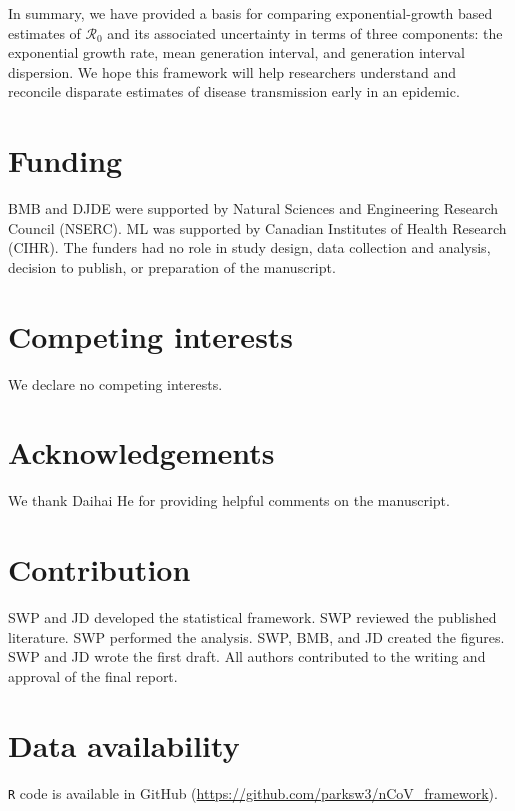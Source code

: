 \documentclass[12pt]{article}
\newcommand{\Ro}{\ensuremath{{\mathcal R}_{0}}\xspace}
\begin{document}
In summary, we have provided a basis for comparing exponential-growth based estimates of \Ro and its associated uncertainty in terms of three components: the exponential growth rate, mean generation interval, and generation interval dispersion. 
We hope this framework will help researchers understand and reconcile disparate estimates of disease transmission early in an epidemic.

\pagebreak

\section*{Funding}

BMB and DJDE were supported by Natural Sciences and Engineering Research Council (NSERC). ML was supported by Canadian Institutes of Health Research (CIHR). The funders had no role in study design, data collection and analysis, decision to publish, or preparation of the manuscript.

\section*{Competing interests}

We declare no competing interests.

\section*{Acknowledgements}

We thank Daihai He for providing helpful comments on the manuscript.

\section*{Contribution}

SWP and JD developed the statistical framework. 
SWP reviewed the published literature.
SWP performed the analysis. 
SWP, BMB, and JD created the figures. 
SWP and JD wrote the first draft.
All authors contributed to the writing and approval of the final report.

\section*{Data availability}

\texttt{R} code is available in GitHub (\url{https://github.com/parksw3/nCoV_framework}).


\pagebreak
\end{document}
